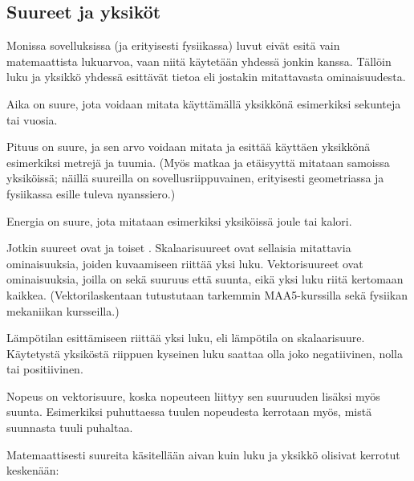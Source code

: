 \subsection*{Suureet ja yksiköt}

Monissa sovelluksissa (ja erityisesti fysiikassa) luvut eivät esitä vain matemaattista lukuarvoa, vaan niitä käytetään yhdessä jonkin  kanssa. Tällöin luku ja yksikkö yhdessä esittävät tietoa  eli jostakin mitattavasta ominaisuudesta.


\begin{esimerkki}

Aika on suure, jota voidaan mitata käyttämällä yksikkönä esimerkiksi sekunteja tai vuosia.

Pituus on suure, ja sen arvo voidaan mitata ja esittää käyttäen yksikkönä esimerkiksi metrejä ja tuumia. (Myös matkaa ja etäisyyttä mitataan samoissa yksiköissä; näillä suureilla on sovellusriippuvainen, erityisesti geometriassa ja fysiikassa esille tuleva nyanssiero.)

Energia on suure, jota mitataan esimerkiksi yksiköissä joule tai kalori.
\end{esimerkki}

Jotkin suureet ovat  ja toiset . Skalaarisuureet ovat sellaisia mitattavia ominaisuuksia, joiden kuvaamiseen riittää yksi luku. Vektorisuureet ovat ominaisuuksia, joilla on sekä suuruus että suunta, eikä yksi luku riitä kertomaan kaikkea. (Vektorilaskentaan tutustutaan tarkemmin MAA5-kurssilla sekä fysiikan mekaniikan kursseilla.)

\begin{esimerkki}

Lämpötilan esittämiseen riittää yksi luku, eli lämpötila on skalaarisuure. Käytetystä yksiköstä riippuen kyseinen luku saattaa olla joko negatiivinen, nolla tai positiivinen.

Nopeus on vektorisuure, koska nopeuteen liittyy sen suuruuden lisäksi myös suunta. Esimerkiksi puhuttaessa tuulen nopeudesta kerrotaan myös, mistä suunnasta tuuli puhaltaa.


\end{esimerkki}

Matemaattisesti suureita käsitellään aivan kuin luku ja yksikkö olisivat kerrotut keskenään:

